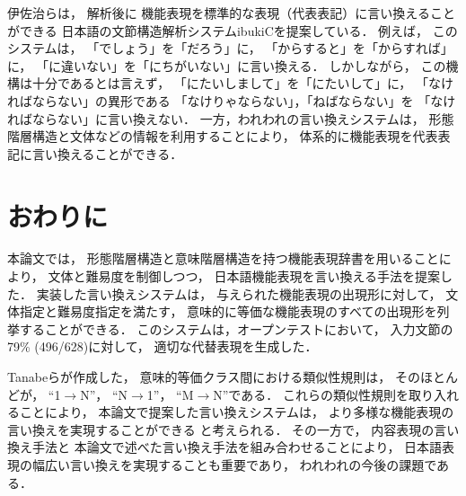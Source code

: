 \documentclass[japanese]{jnlp_1.4}
\begin{document}
伊佐治らは，
解析後に
機能表現を標準的な表現（代表表記）に言い換えることができる
日本語の文節構造解析システムibukiCを提案している．
例えば，
このシステムは，
「でしょう」を「だろう」に，
「からすると」を「からすれば」に，
「に違いない」を「にちがいない」に言い換える．
しかしながら，
この機構は十分であるとは言えず，
「にたいしまして」を「にたいして」に，
「なければならない」の異形である
「なけりゃならない」，「ねばならない」を
「なければならない」に言い換えない．
一方，われわれの言い換えシステムは，
形態階層構造と文体などの情報を利用することにより，
体系的に機能表現を代表表記に言い換えることができる．



\section{おわりに}

本論文では，
形態階層構造と意味階層構造を持つ機能表現辞書を用いることにより，
文体と難易度を制御しつつ，
日本語機能表現を言い換える手法を提案した．
実装した言い換えシステムは，
与えられた機能表現の出現形に対して，
文体指定と難易度指定を満たす，
意味的に等価な機能表現のすべての出現形を列挙することができる．
このシステムは，オープンテストにおいて，
入力文節の79\% (496/628)に対して，
適切な代替表現を生成した．

Tanabeらが作成した，
意味的等価クラス間における類似性規則は，
そのほとんどが，
``1$\rightarrow$N''，
``N$\rightarrow$1''，
``M$\rightarrow$N''である．
これらの類似性規則を取り入れることにより，
本論文で提案した言い換えシステムは，
より多様な機能表現の言い換えを実現することができる
と考えられる．
その一方で，
内容表現の言い換え手法と
本論文で述べた言い換え手法を組み合わせることにより，
日本語表現の幅広い言い換えを実現することも重要であり，
われわれの今後の課題である．
\end{document}
